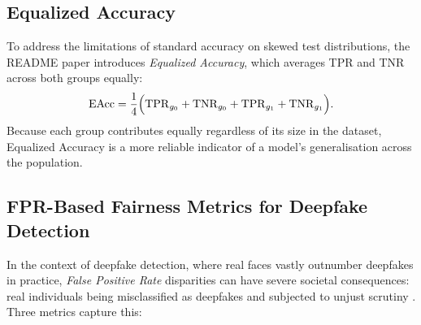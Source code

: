 \subsection{Equalized Accuracy}
\label{subsec:equalized_acc}

To address the limitations of standard accuracy on skewed test
distributions, the README paper \cite{park2020} introduces
\emph{Equalized Accuracy}, which averages TPR and TNR across
both groups equally:
\begin{equation}
  \mathrm{EAcc}
  = \frac{1}{4}\Bigl(
      \mathrm{TPR}_{g_0} + \mathrm{TNR}_{g_0}
      + \mathrm{TPR}_{g_1} + \mathrm{TNR}_{g_1}
    \Bigr).
  \label{eq:equalized_acc}
\end{equation}
Because each group contributes equally regardless of its size in
the dataset, Equalized Accuracy is a more reliable indicator of
a model's generalisation across the population.

\subsection{FPR-Based Fairness Metrics for Deepfake Detection}
\label{subsec:fpr_metrics}

In the context of deepfake detection, where real faces vastly
outnumber deepfakes in practice, \emph{False Positive Rate}
disparities can have severe societal consequences: real individuals
being misclassified as deepfakes and subjected to unjust scrutiny
\cite{ju2024}.  Three metrics capture this:

